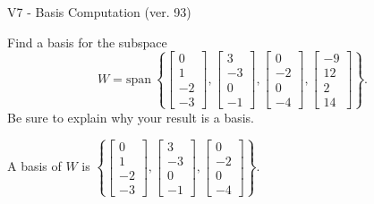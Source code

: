 \begin{exercise}
  \begin{exerciseTitle}V7 - Basis Computation (ver. 93)\end{exerciseTitle}
  \begin{exerciseStatement}
    Find a basis for the subspace 
\[W=\mathrm{span}\ \left\{\left[\begin{array}{r}
0 \\
1 \\
-2 \\
-3
\end{array}\right] , \left[\begin{array}{r}
3 \\
-3 \\
0 \\
-1
\end{array}\right] , \left[\begin{array}{r}
0 \\
-2 \\
0 \\
-4
\end{array}\right] , \left[\begin{array}{r}
-9 \\
12 \\
2 \\
14
\end{array}\right]\right\}.\]
 Be sure to explain why your result is a basis.


  \end{exerciseStatement}
  \begin{exerciseAnswer}
   A basis of \(W\) is  \(\left\{\left[\begin{array}{r}
0 \\
1 \\
-2 \\
-3
\end{array}\right] , \left[\begin{array}{r}
3 \\
-3 \\
0 \\
-1
\end{array}\right] , \left[\begin{array}{r}
0 \\
-2 \\
0 \\
-4
\end{array}\right]\right\}\).
  


  \end{exerciseAnswer}
\end{exercise}